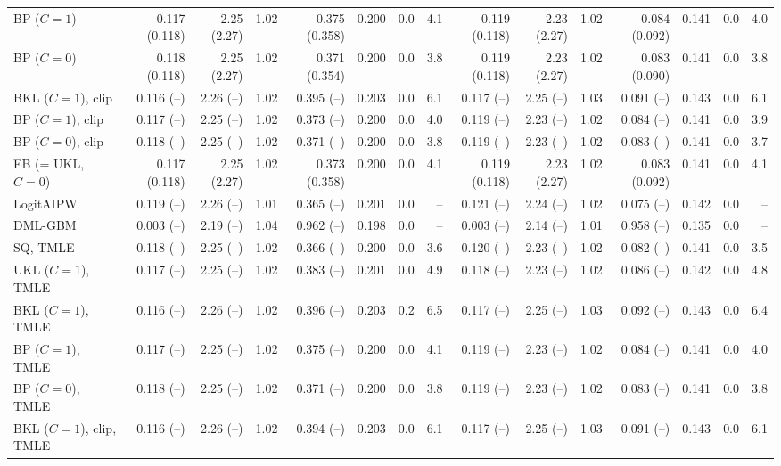 \begin{tabular}{lrrrrrrrrrrrrrr}
BP ($C=1$) & 0.117 (0.118) & 2.25 (2.27) & 1.02 & 0.375 (0.358) & 0.200 & 0.0 & 4.1 & 0.119 (0.118) & 2.23 (2.27) & 1.02 & 0.084 (0.092) & 0.141 & 0.0 & 4.0 \\
BP ($C=0$) & 0.118 (0.118) & 2.25 (2.27) & 1.02 & 0.371 (0.354) & 0.200 & 0.0 & 3.8 & 0.119 (0.118) & 2.23 (2.27) & 1.02 & 0.083 (0.090) & 0.141 & 0.0 & 3.8 \\
BKL ($C=1$), clip & 0.116 (--) & 2.26 (--) & 1.02 & 0.395 (--) & 0.203 & 0.0 & 6.1 & 0.117 (--) & 2.25 (--) & 1.03 & 0.091 (--) & 0.143 & 0.0 & 6.1 \\
BP ($C=1$), clip & 0.117 (--) & 2.25 (--) & 1.02 & 0.373 (--) & 0.200 & 0.0 & 4.0 & 0.119 (--) & 2.23 (--) & 1.02 & 0.084 (--) & 0.141 & 0.0 & 3.9 \\
BP ($C=0$), clip & 0.118 (--) & 2.25 (--) & 1.02 & 0.371 (--) & 0.200 & 0.0 & 3.8 & 0.119 (--) & 2.23 (--) & 1.02 & 0.083 (--) & 0.141 & 0.0 & 3.7 \\
EB (= UKL, $C=0$) & 0.117 (0.118) & 2.25 (2.27) & 1.02 & 0.373 (0.358) & 0.200 & 0.0 & 4.1 & 0.119 (0.118) & 2.23 (2.27) & 1.02 & 0.083 (0.092) & 0.141 & 0.0 & 4.1 \\
LogitAIPW & 0.119 (--) & 2.26 (--) & 1.01 & 0.365 (--) & 0.201 & 0.0 & -- & 0.121 (--) & 2.24 (--) & 1.02 & 0.075 (--) & 0.142 & 0.0 & -- \\
DML-GBM & 0.003 (--) & 2.19 (--) & 1.04 & 0.962 (--) & 0.198 & 0.0 & -- & 0.003 (--) & 2.14 (--) & 1.01 & 0.958 (--) & 0.135 & 0.0 & -- \\
SQ, TMLE & 0.118 (--) & 2.25 (--) & 1.02 & 0.366 (--) & 0.200 & 0.0 & 3.6 & 0.120 (--) & 2.23 (--) & 1.02 & 0.082 (--) & 0.141 & 0.0 & 3.5 \\
UKL ($C=1$), TMLE & 0.117 (--) & 2.25 (--) & 1.02 & 0.383 (--) & 0.201 & 0.0 & 4.9 & 0.118 (--) & 2.23 (--) & 1.02 & 0.086 (--) & 0.142 & 0.0 & 4.8 \\
BKL ($C=1$), TMLE & 0.116 (--) & 2.26 (--) & 1.02 & 0.396 (--) & 0.203 & 0.2 & 6.5 & 0.117 (--) & 2.25 (--) & 1.03 & 0.092 (--) & 0.143 & 0.0 & 6.4 \\
BP ($C=1$), TMLE & 0.117 (--) & 2.25 (--) & 1.02 & 0.375 (--) & 0.200 & 0.0 & 4.1 & 0.119 (--) & 2.23 (--) & 1.02 & 0.084 (--) & 0.141 & 0.0 & 4.0 \\
BP ($C=0$), TMLE & 0.118 (--) & 2.25 (--) & 1.02 & 0.371 (--) & 0.200 & 0.0 & 3.8 & 0.119 (--) & 2.23 (--) & 1.02 & 0.083 (--) & 0.141 & 0.0 & 3.8 \\
BKL ($C=1$), clip, TMLE & 0.116 (--) & 2.26 (--) & 1.02 & 0.394 (--) & 0.203 & 0.0 & 6.1 & 0.117 (--) & 2.25 (--) & 1.03 & 0.091 (--) & 0.143 & 0.0 & 6.1 \\

\end{tabular}
